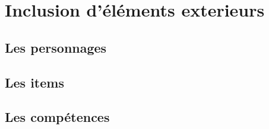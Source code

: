 \chapter{Inclusion d'éléments exterieurs}

	\section{Les personnages}

	\section{Les items}

	\section{Les compétences}
